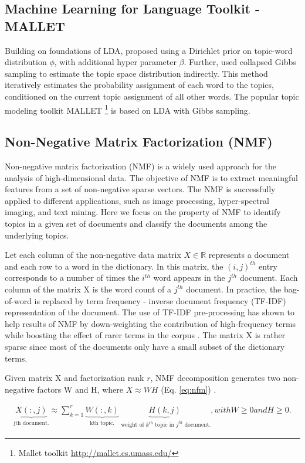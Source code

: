 \subsection{Machine Learning for Language Toolkit - MALLET}
Building on foundations of LDA, \cite{Griffiths} proposed using a Dirichlet prior on topic-word distribution $\phi$, with additional hyper parameter $\beta$. Further, \cite{Griffiths} used collapsed Gibbs sampling to estimate the topic space distribution indirectly. This method iteratively estimates the probability assignment of each word to the topics, conditioned on the current topic assignment of all other words. The popular topic modeling toolkit MALLET \footnote{Mallet toolkit \url{http://mallet.cs.umass.edu/}} is based on LDA with Gibbs sampling.


\subsection{Non-Negative Matrix Factorization (NMF)} \label{NMF}
Non-negative matrix factorization (NMF) \cite{Lee1999} is a widely used approach for the analysis of high-dimensional data. The objective of NMF is to extract meaningful features from a set of non-negative sparse vectors. The NMF is successfully applied to different applications, such as image processing, hyper-spectral imaging,  and text mining.  Here we focus on the property of NMF to identify topics in a given set of documents and classify the documents among the underlying topics.

Let each column of the non-negative data matrix $X \in \mathbb{R}$ represents a document and each row to a word in the dictionary. In this matrix, the $(i, j)^{th}$ entry corresponds to a number of times the $i^{th}$ word appears in the $j^{th}$ document. Each column of the matrix X is the word count of a $j^{th}$ document. In practice, the bag-of-word is replaced by term frequency - inverse document frequency (TF-IDF) representation of the document. The use of TF-IDF pre-processing has shown to help results of NMF by down-weighting the contribution of high-frequency terms while boosting the effect of rarer terms in the corpus \cite{Greene2016, Gillis2014}. The matrix X is rather sparse since most of the documents only have a small subset of the dictionary terms.

Given matrix X and factorization rank $r$, NMF decomposition generates two non-negative factors W and H, where $X \approx W H$ (Eq. \ref{eq:nfm}) \cite{Lee1999}. 

\begin{multline}\label{eq:nfm}
\underbrace{X(:,j)}_\text{jth document.} \approx \sum_{k=1}^{r} \underbrace{W(:,k)}_\text{kth topic.} \underbrace{H(k,j)}_\text{ weight of $k^{th}$ topic in $j^{th}$ document.} , 
with W \geq 0 and H \geq 0.
\end{multline}

